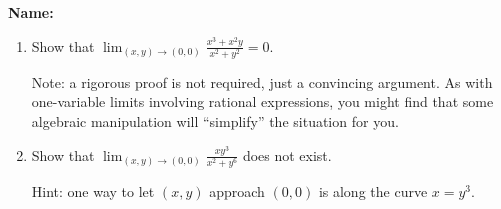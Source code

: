 \documentclass[12pt]{article}
\begin{document}
{\bf \Large Name:}
\thispagestyle{fancy}

 \begin{enumerate}
 \item Show that $\displaystyle \lim_{(x,y)\to (0,0)}\frac{x^3+x^2y}{x^2+y^2} = 0$.

Note: a rigorous proof is not required, just a convincing argument. As with one-variable limits involving rational expressions, you might find that some algebraic manipulation will ``simplify'' the situation for you.
 
\vspace{3.5in}

 \item Show that $\displaystyle \lim_{(x,y)\to (0,0)}\frac{xy^3}{x^2+y^6}$ does not exist.

Hint: one way to let $(x,y)$ approach $(0,0)$ is along the curve $x=y^3$.

 \end{enumerate}
\end{document}
